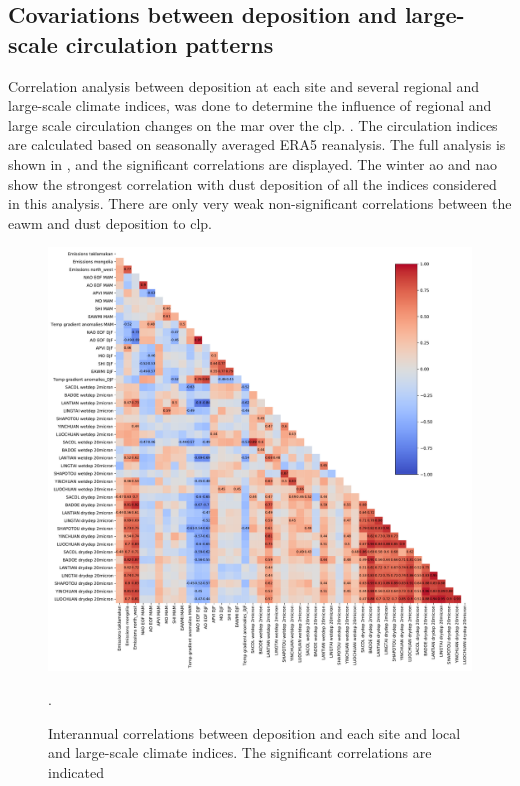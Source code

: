 \subsection{Covariations between deposition and large-scale circulation patterns}
Correlation analysis between deposition at each site and several regional and large-scale climate indices, was done to determine the influence of regional and large scale circulation changes on the \acrshort{mar} over the \acrshort{clp}. .
The circulation indices are calculated based on seasonally averaged ERA5 reanalysis. 
The full analysis is shown in , and the significant correlations are displayed. 
The winter \acrshort{ao} and \acrshort{nao} show the strongest correlation with dust deposition of all the indices considered in this analysis. 
There are only very weak non-significant correlations between the \acrshort{eawm} and dust deposition to \acrshort{clp}. 

\begin{figure}[htpb]
    \centering
    \includegraphics[width=\textwidth]{texfiles/figs/correlations.pdf}
    \caption{Interannual correlations between deposition and each site and local and large-scale climate indices. The significant correlations are indicated}.
    \label{fig:correlations}
\end{figure}


